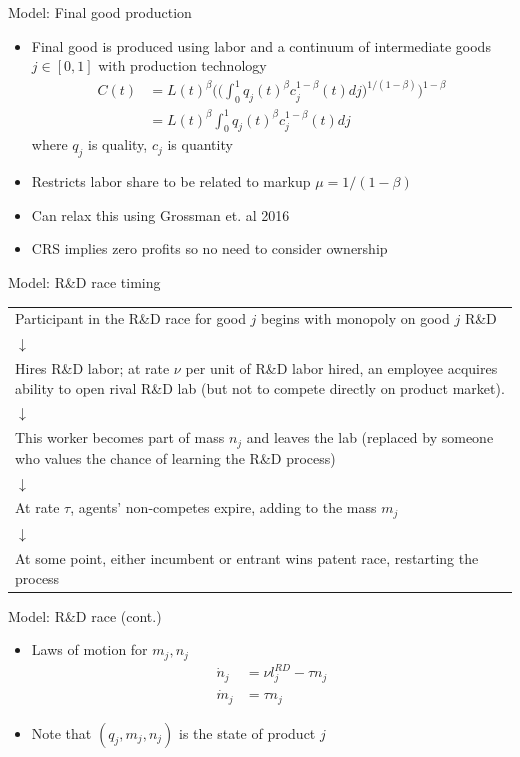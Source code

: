 \documentclass[english,usenames,dvipsnames]{beamer}
\begin{document}
\begin{frame}{Model: Final good production}
\begin{itemize}
	\item Final good is produced using labor and a continuum of intermediate goods $j\in[0,1]$ with production technology
	\begin{align*}
	C(t) &= L(t)^{\beta}\Bigg(\Big(\int_0^1 q_j(t)^\beta 
	c_j^{1-\beta}(t)dj \Big)^{1/(1-\beta)}\Bigg)^{1-\beta} \\
		&=  L(t)^{\beta}\int_0^1 q_j(t)^\beta c_j^{1-\beta}(t)dj
	\end{align*}
	where $q_j$ is quality, $c_j$ is quantity
	\item Restricts labor share to be related to markup $\mu = 1/(1-\beta)$
	\item Can relax this using Grossman et. al 2016
	\item CRS implies zero profits so no need to consider ownership
\end{itemize}
\end{frame}

\begin{frame}{Model: R\&D race timing}
\begin{table}
	\begin{tabular}{p{}}
		\centering
		Participant in the R\&D race for good $j$ begins with monopoly on good $j$ R\&D \\
		$\downarrow$\\
		Hires R\&D labor; at rate $\nu$ per unit of R\&D labor hired, an employee acquires ability to open rival R\&D lab (but not to compete directly on product market). \\
		$\downarrow$\\
		This worker becomes part of mass $n_j$ and leaves the lab (replaced by someone who values the chance of learning the R\&D process)\\ 
		$\downarrow$\\
		At rate $\tau$, agents' non-competes expire, adding to the mass $m_j$ \\
		$\downarrow$\\
		At some point, either incumbent or entrant wins patent race, restarting the process 
	\end{tabular}
\end{table}
\end{frame}

\begin{frame}{Model: R\&D race (cont.)}
\begin{itemize}
	\item Laws of motion for $m_j,n_j$
	\begin{align*}
	\dot{n}_j &= \nu l_j^{RD} - \tau n_j \\
	\dot{m}_j &= \tau n_j
	\end{align*}
	\item Note that $(q_j,m_j,n_j)$ is the state of product $j$	
\end{itemize}
\end{frame}
\end{document}
